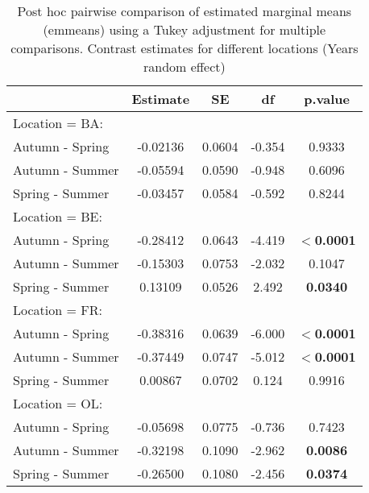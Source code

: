 \documentclass{article}
\begin{document}
\begin{table}[h]
\centering
\caption{Post hoc pairwise comparison of estimated marginal means (emmeans) using a Tukey adjustment for multiple comparisons. Contrast estimates for different locations (Years random effect)}
\label{tab:contrasts}

\begin{tabular}{lcccc}
 & Estimate & SE & df & p.value\\
\hline
Location = BA: \\ Autumn - Spring & -0.02136 & 0.0604 & -0.354 & 0.9333 \\
Autumn - Summer & -0.05594 & 0.0590 & -0.948 & 0.6096 \\
Spring - Summer & -0.03457 & 0.0584 & -0.592 & 0.8244 \\ \hline
Location = BE: \\ Autumn - Spring & -0.28412 & 0.0643 & -4.419 & \textbf{$<$0.0001} \\
Autumn - Summer & -0.15303 & 0.0753 & -2.032 & 0.1047 \\
Spring - Summer & 0.13109 & 0.0526 & 2.492 & \textbf{0.0340} \\ \hline
Location = FR: \\ Autumn - Spring & -0.38316 & 0.0639 & -6.000 & \textbf{$<$0.0001} \\
Autumn - Summer & -0.37449 & 0.0747 & -5.012 & \textbf{$<$0.0001} \\
Spring - Summer & 0.00867 & 0.0702 & 0.124 & 0.9916 \\ \hline
Location = OL: \\ Autumn - Spring & -0.05698 & 0.0775 & -0.736 & 0.7423 \\
Autumn - Summer & -0.32198 & 0.1090 & -2.962 & \textbf{0.0086} \\
Spring - Summer & -0.26500 & 0.1080 & -2.456 & \textbf{0.0374} \\ \hline
\end{tabular}
\end{table}
\end{document}

